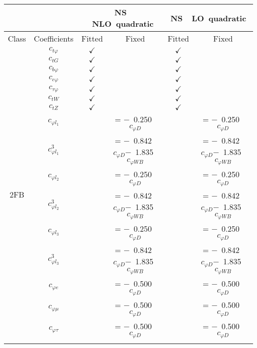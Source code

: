 \documentclass{article}
\begin{document}
\begin{table}[H]
\centering
\begin{tabular}{|c|c|c|c|c|c|}
\hline
 &  & \multicolumn{2}{c|}{\rm NS \ NLO\ quadratic} & \multicolumn{2}{c|}{\rm NS\ \ LO\ quadratic} \\ \hline
Class & Coefficients & Fitted & Fixed  & Fitted & Fixed  \\ \hline
\multirow{24}{*}{2FB}
 & $c_{t \varphi}$ & $\checkmark$ &  & $\checkmark$ & \\ \cline{2-6}
 & $c_{tG}$ & $\checkmark$ &  & $\checkmark$ & \\ \cline{2-6}
 & $c_{b \varphi}$ & $\checkmark$ &  & $\checkmark$ & \\ \cline{2-6}
 & $c_{c \varphi}$ & $\checkmark$ &  & $\checkmark$ & \\ \cline{2-6}
 & $c_{\tau \varphi}$ & $\checkmark$ &  & $\checkmark$ & \\ \cline{2-6}
 & $c_{tW}$ & $\checkmark$ &  & $\checkmark$ & \\ \cline{2-6}
 & $c_{tZ}$ & $\checkmark$ &  & $\checkmark$ & \\ \cline{2-6}
 & $c_{\varphi l_1}$ & & = $-$\ 0.250\ $c_{\varphi D}$ & & = $-$\ 0.250\ $c_{\varphi D}$\\ \cline{2-6}
 & $c_{\varphi l_1}^{3}$ & & = $-$\ 0.842\ $c_{\varphi D}$$-$\ 1.835\ $c_{\varphi WB}$ & & = $-$\ 0.842\ $c_{\varphi D}$$-$\ 1.835\ $c_{\varphi WB}$\\ \cline{2-6}
 & $c_{\varphi l_2}$ & & = $-$\ 0.250\ $c_{\varphi D}$ & & = $-$\ 0.250\ $c_{\varphi D}$\\ \cline{2-6}
 & $c_{\varphi l_2}^{3}$ & & = $-$\ 0.842\ $c_{\varphi D}$$-$\ 1.835\ $c_{\varphi WB}$ & & = $-$\ 0.842\ $c_{\varphi D}$$-$\ 1.835\ $c_{\varphi WB}$\\ \cline{2-6}
 & $c_{\varphi l_3}$ & & = $-$\ 0.250\ $c_{\varphi D}$ & & = $-$\ 0.250\ $c_{\varphi D}$\\ \cline{2-6}
 & $c_{\varphi l_3}^{3}$ & & = $-$\ 0.842\ $c_{\varphi D}$$-$\ 1.835\ $c_{\varphi WB}$ & & = $-$\ 0.842\ $c_{\varphi D}$$-$\ 1.835\ $c_{\varphi WB}$\\ \cline{2-6}
 & $c_{\varphi e}$ & & = $-$\ 0.500\ $c_{\varphi D}$ & & = $-$\ 0.500\ $c_{\varphi D}$\\ \cline{2-6}
 & $c_{\varphi \mu}$ & & = $-$\ 0.500\ $c_{\varphi D}$ & & = $-$\ 0.500\ $c_{\varphi D}$\\ \cline{2-6}
 & $c_{\varphi \tau}$ & & = $-$\ 0.500\ $c_{\varphi D}$ & & = $-$\ 0.500\ $c_{\varphi D}$\\ \cline{2-6}

\end{tabular}
\end{table}
\end{document}
